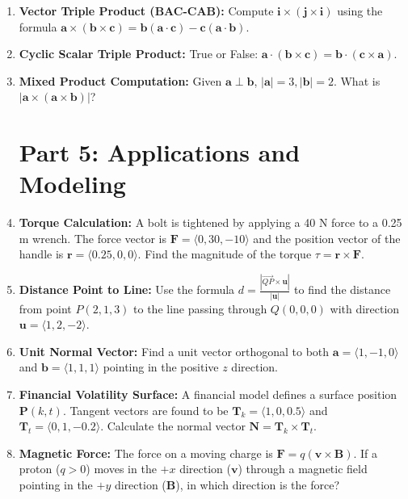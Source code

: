 \documentclass[11pt]{article}
\begin{document}
\begin{enumerate}
    \item \textbf{Vector Triple Product (BAC-CAB):} Compute $\mathbf{i} \times (\mathbf{j} \times \mathbf{i})$ using the formula $\mathbf{a} \times (\mathbf{b} \times \mathbf{c}) = \mathbf{b}(\mathbf{a} \cdot \mathbf{c}) - \mathbf{c}(\mathbf{a} \cdot \mathbf{b})$.
    
    \item \textbf{Cyclic Scalar Triple Product:} True or False: $\mathbf{a} \cdot (\mathbf{b} \times \mathbf{c}) = \mathbf{b} \cdot (\mathbf{c} \times \mathbf{a})$. 
    
    \item \textbf{Mixed Product Computation:} Given $\mathbf{a} \perp \mathbf{b}$, $|\mathbf{a}|=3, |\mathbf{b}|=2$. What is $|\mathbf{a} \times (\mathbf{a} \times \mathbf{b})|$?

\section*{Part 5: Applications and Modeling}
    
    \item \textbf{Torque Calculation:} A bolt is tightened by applying a 40 N force to a 0.25 m wrench. The force vector is $\mathbf{F} = \langle 0, 30, -10 \rangle$ and the position vector of the handle is $\mathbf{r} = \langle 0.25, 0, 0 \rangle$. Find the magnitude of the torque $\tau = \mathbf{r} \times \mathbf{F}$.
    
    \item \textbf{Distance Point to Line:} Use the formula $d = \frac{|\vec{QP} \times \mathbf{u}|}{|\mathbf{u}|}$ to find the distance from point $P(2,1,3)$ to the line passing through $Q(0,0,0)$ with direction $\mathbf{u} = \langle 1, 2, -2 \rangle$.
    
    \item \textbf{Unit Normal Vector:} Find a unit vector orthogonal to both $\mathbf{a} = \langle 1, -1, 0 \rangle$ and $\mathbf{b} = \langle 1, 1, 1 \rangle$ pointing in the positive $z$ direction.
    
    \item \textbf{Financial Volatility Surface:} A financial model defines a surface position $\mathbf{P}(k,t)$. Tangent vectors are found to be $\mathbf{T}_k = \langle 1, 0, 0.5 \rangle$ and $\mathbf{T}_t = \langle 0, 1, -0.2 \rangle$. Calculate the normal vector $\mathbf{N} = \mathbf{T}_k \times \mathbf{T}_t$.
    
    \item \textbf{Magnetic Force:} The force on a moving charge is $\mathbf{F} = q(\mathbf{v} \times \mathbf{B})$. If a proton ($q > 0$) moves in the $+x$ direction ($\mathbf{v}$) through a magnetic field pointing in the $+y$ direction ($\mathbf{B}$), in which direction is the force?


\end{enumerate}
\end{document}
